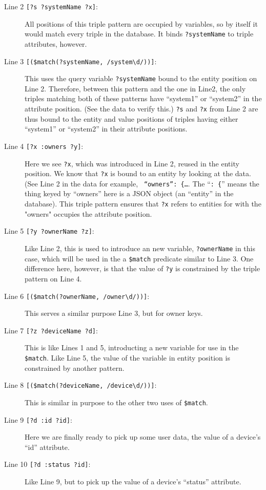 \documentclass[9pt,letterpaper]{article}
\newcommand{\stt}[1]{\texttt{#1}} %
\begin{document}
\begin{description}
\item[Line 2 \stt{[?s ?systemName ?x]}:] All positions of this triple pattern are occupied by variables, so by itself it would match every triple in the database. It binds \stt{?systemName} to triple attributes, however.
\item[Line 3 \stt{[(\$match(?systemName, /system\textbackslash d/))]}:] This uses the query variable \stt{?systemName} bound to the entity position on Line 2.
  Therefore, between this pattern and the one in Line2, the only triples matching both of these patterns have ``system1'' or ``system2'' in the attribute position. (See the data to verify this.)
  \stt{?s} and \stt{?x} from Line 2 are thus bound to the entity and value positions of triples having either ``system1'' or ``system2'' in their attribute positions.
\item[Line 4 \stt{[?x :owners ?y]}:] Here we see \stt{?x}, which was introduced in Line 2, reused in the entity position.
  We know that \stt{?x} is bound to an entity by looking at the data.
  (See Line 2 in the data for example, \stt{ ``owners'': \{\ldots}. The ``\stt{: \{}'' means the thing keyed by ``owners'' here is a JSON object (an ``entity'' in the database).
  This triple pattern ensures that \stt{?x} refers to entities for with the "owners" occupies the attribute position.
\item[Line 5 \stt{[?y ?ownerName ?z]}:]  Like Line 2, this is used to introduce an new variable, \stt{?ownerName} in this case, which will be used in the a \stt{\$match} predicate similar to Line 3.
  One difference here, however, is that the value of \stt{?y} is constrained by the triple pattern on Line 4.
\item[Line 6 \stt{[(\$match(?ownerName, /owner\textbackslash d/))]}:] This serves a similar purpose Line 3, but for owner keys.
\item[Line 7 \stt{[?z ?deviceName ?d]}:] This is like Lines 1 and 5, introducting a new variable for use in the \stt{\$match}.
  Like Line 5, the value of the variable in entity position is constrained by another pattern.
\item[Line 8 \stt{[(\$match(?deviceName, /device\textbackslash d/))]}:] This is similar in purpose to the other two uses of \stt{\$match}.
\item[Line 9 \stt{[?d :id ?id]}:] Here we are finally ready to pick up some user data, the value of a device's ``id'' attribute.
\item[Line 10 \stt{[?d :status ?id]}:] Like Line 9, but to pick up the value of a device's ``status'' attribute.
\end{description}
\end{document}
